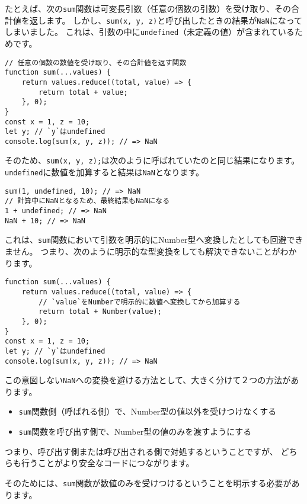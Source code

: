 たとえば、次の\texttt{sum}関数は可変長引数（任意の個数の引数）を受け取り、その合計値を返します。
しかし、\texttt{sum(x, y, z)}と呼び出したときの結果が\texttt{NaN}になってしまいました。
これは、引数の中に\texttt{undefined}（未定義の値）が含まれているためです。

\begin{lstlisting}
// 任意の個数の数値を受け取り、その合計値を返す関数
function sum(...values) {
    return values.reduce((total, value) => {
        return total + value;
    }, 0);
}
const x = 1, z = 10;
let y; // `y`はundefined
console.log(sum(x, y, z)); // => NaN
\end{lstlisting}

そのため、\texttt{sum(x, y, z);}は次のように呼ばれていたのと同じ結果になります。
\texttt{undefined}に数値を加算すると結果は\texttt{NaN}となります。

\begin{lstlisting}
sum(1, undefined, 10); // => NaN
// 計算中にNaNとなるため、最終結果もNaNになる
1 + undefined; // => NaN
NaN + 10; // => NaN
\end{lstlisting}

これは、\texttt{sum}関数において引数を明示的にNumber型へ変換したとしても回避できません。
つまり、次のように明示的な型変換をしても解決できないことがわかります。

\begin{lstlisting}
function sum(...values) {
    return values.reduce((total, value) => {
        // `value`をNumberで明示的に数値へ変換してから加算する
        return total + Number(value);
    }, 0);
}
const x = 1, z = 10;
let y; // `y`はundefined
console.log(sum(x, y, z)); // => NaN
\end{lstlisting}

この意図しない\texttt{NaN}への変換を避ける方法として、大きく分けて２つの方法があります。

\begin{itemize}
\item
  \texttt{sum}関数側（呼ばれる側）で、Number型の値以外を受けつけなくする
\item
  \texttt{sum}関数を呼び出す側で、Number型の値のみを渡すようにする
\end{itemize}

つまり、呼び出す側または呼び出される側で対処するということですが、
どちらも行うことがより安全なコードにつながります。

そのためには、\texttt{sum}関数が数値のみを受けつけるということを明示する必要があります。

